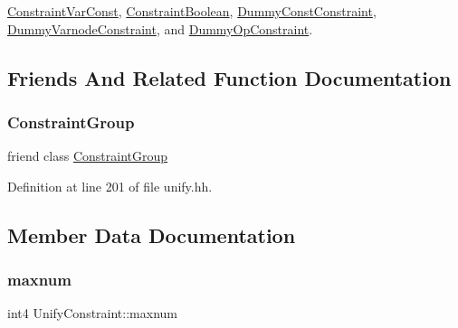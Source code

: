 \mbox{\hyperlink{class_constraint_var_const_a2c4e5c53f16ad3a76ab6c54c850b3d5b}{Constraint\+Var\+Const}}, \mbox{\hyperlink{class_constraint_boolean_af67fc020025d19e97b82dd7c7483cf1a}{Constraint\+Boolean}}, \mbox{\hyperlink{class_dummy_const_constraint_a3c0468211fcda260305a430622872e72}{Dummy\+Const\+Constraint}}, \mbox{\hyperlink{class_dummy_varnode_constraint_a70d9094ae099aa7f9259e2374ca1a8ed}{Dummy\+Varnode\+Constraint}}, and \mbox{\hyperlink{class_dummy_op_constraint_a4f2cc27e6d3181b10bf078fb434102a9}{Dummy\+Op\+Constraint}}.



\subsection{Friends And Related Function Documentation}
\mbox{\label{class_unify_constraint_a2131c775acfc52d54dfc7a22b4f538db}} 
\subsubsection{\texorpdfstring{ConstraintGroup}{ConstraintGroup}}
{\footnotesize\ttfamily friend class \mbox{\hyperlink{class_constraint_group}{Constraint\+Group}}\hspace{0.3cm}{\ttfamily [friend]}}



Definition at line 201 of file unify.\+hh.



\subsection{Member Data Documentation}
\mbox{\label{class_unify_constraint_a9123065d84784017ba4e08a1bcc03450}} 
\subsubsection{\texorpdfstring{maxnum}{maxnum}}
{\footnotesize\ttfamily int4 Unify\+Constraint\+::maxnum\hspace{0.3cm}{\ttfamily [protected]}}



